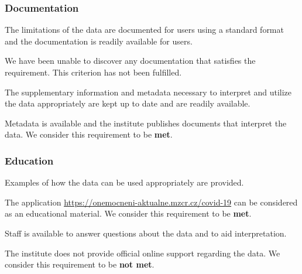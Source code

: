 \subsubsection{Documentation}

\begin{QandA}
    \item The limitations of the data are documented for users using a standard format and the documentation is readily available for users.
    \begin{answered}
        We have been unable to discover any documentation that satisfies the requirement.
        This criterion has not been fulfilled.
    \end{answered}

    \item The supplementary information and metadata necessary to interpret and utilize the data appropriately are kept up to date and are readily available.
    \begin{answered}
        Metadata is available and the institute publishes documents that interpret the data.
        We consider this requirement to be \textbf{met}.
    \end{answered}

\end{QandA}

\subsubsection{Education}

\begin{QandA}
    \item Examples of how the data can be used appropriately are provided.
    \begin{answered}
        The application \url{https://onemocneni-aktualne.mzcr.cz/covid-19} can be considered as an educational material.
        We consider this requirement to be \textbf{met}.
    \end{answered}

    \item Staff is available to answer questions about the data and to aid interpretation.
    \begin{answered}
        The institute does not provide official online support regarding the data.
        We consider this requirement to be \textbf{not met}.
    \end{answered}

\end{QandA}

